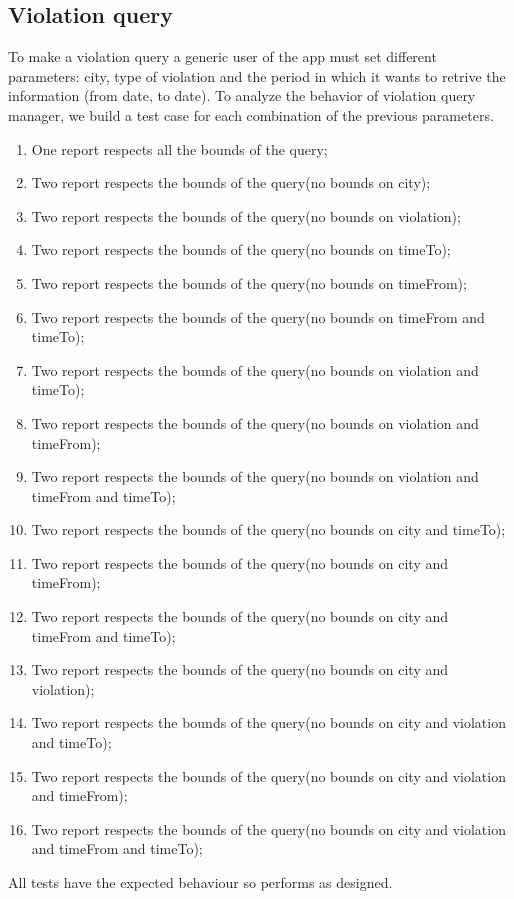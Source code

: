 \documentclass[../ITD.tex]{subfiles}
\begin{document}
    \subsection{Violation query}\label{subsec:violation-query}
    To make a violation query a generic user of the app must set different parameters: city, type of violation and the period in which it wants to retrive the information (from date, to date).
    To analyze the behavior of violation query manager, we build a test case for each combination of the previous parameters.
    \begin{enumerate}
        \item One report respects all the bounds of the query;
        \item Two report respects the bounds of the query(no bounds on city);
        \item Two report respects the bounds of the query(no bounds on violation);
        \item Two report respects the bounds of the query(no bounds on timeTo);
        \item Two report respects the bounds of the query(no bounds on timeFrom);
        \item Two report respects the bounds of the query(no bounds on timeFrom and timeTo);
        \item Two report respects the bounds of the query(no bounds on violation and timeTo);
        \item Two report respects the bounds of the query(no bounds on violation and timeFrom);
        \item Two report respects the bounds of the query(no bounds on violation and timeFrom and timeTo);
        \item Two report respects the bounds of the query(no bounds on city and timeTo);
        \item Two report respects the bounds of the query(no bounds on city and timeFrom);
        \item Two report respects the bounds of the query(no bounds on city and timeFrom and timeTo);
        \item Two report respects the bounds of the query(no bounds on city and violation);
        \item Two report respects the bounds of the query(no bounds on city and violation and timeTo);
        \item Two report respects the bounds of the query(no bounds on city and violation and timeFrom);
        \item Two report respects the bounds of the query(no bounds on city and violation and timeFrom and timeTo);
    \end{enumerate}
    All tests have the expected behaviour so performs as designed.
\end{document}
